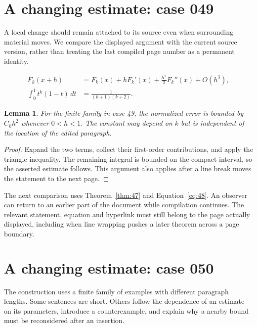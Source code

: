 \documentclass[a4paper,10pt]{article}
\newtheorem{lemma}[theorem]{Lemma}
\begin{document}
\lipsum[13]

\section{A changing estimate: case 049}\label{unit:48}
A local change should remain attached to its source even when surrounding material moves. We compare the displayed argument with the current source version, rather than treating the last compiled page number as a permanent identity.

\lipsum[25-26]
\begin{align}\label{eq:48}
 F_k(x+h)&=F_k(x)+hF_k'(x)+\frac{h^2}{2}F_k''(x)+O(h^3),\\
 \int_0^1 t^k(1-t)\,dt&=\frac{1}{(k+1)(k+2)}.
\end{align}
\begin{lemma}\label{thm:48}
For the finite family in case 49, the normalized error is bounded by $C_k h^2$ whenever $0<h<1$. The constant may depend on $k$ but is independent of the location of the edited paragraph.
\end{lemma}
\begin{proof}
Expand the two terms, collect their first-order contributions, and apply the
triangle inequality. The remaining integral is bounded on the compact interval,
so the asserted estimate follows. This argument also applies after a line break
moves the statement to the next page.
\end{proof}
The next comparison uses Theorem~\ref{thm:47} and Equation~\ref{eq:48}. An observer can return to an earlier part of the document while compilation continues. The relevant statement, equation and hyperlink must still belong to the page actually displayed, including when line wrapping pushes a later theorem across a page boundary.

\lipsum[18]

\section{A changing estimate: case 050}\label{unit:49}
The construction uses a finite family of examples with different paragraph lengths. Some sentences are short. Others follow the dependence of an estimate on its parameters, introduce a counterexample, and explain why a nearby bound must be reconsidered after an insertion.
\end{document}
